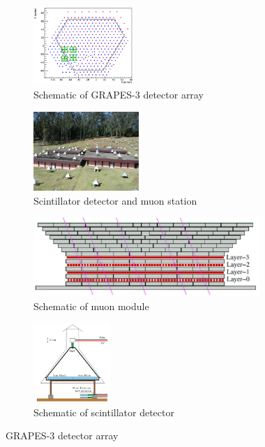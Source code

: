 \documentclass[12pt]{article}
\begin{document}
\begin{figure}[h]
\begin{subfigure}{0.245\textwidth}
\includegraphics[width=0.9\linewidth, height=3cm]{array-map} 
\caption{Schematic of GRAPES-3 detector array}
\label{fig:array-map}
\end{subfigure}
\begin{subfigure}{0.245\textwidth}
\includegraphics[width=0.9\linewidth, height=3cm]{detector} 
\caption{Scintillator detector and muon station}
\label{fig:detector}
\end{subfigure}
\begin{subfigure}{0.245\textwidth}
\includegraphics[width=0.9\linewidth, height = 3cm]{mu-station} 
\caption{Schematic of muon module}
\label{fig:mu-station}
\end{subfigure}
\begin{subfigure}{0.245\textwidth}
\includegraphics[width=0.9\linewidth, height = 3cm]{sc-detector}
\caption{Schematic of scintillator detector}
\label{fig:sc-detector}
\end{subfigure}
\caption{GRAPES-3 detector array}
\label{fig:g3array}
\end{figure}
 
\end{document}
